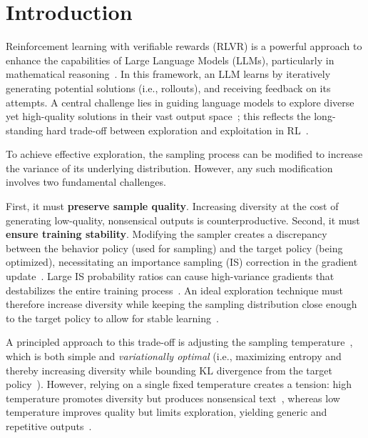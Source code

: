 \section{Introduction}
\label{sec:introduction}

Reinforcement learning with verifiable rewards (RLVR) is a powerful approach to enhance the capabilities of Large Language Models (LLMs), particularly in mathematical reasoning~\citep{openai2024learning, guo2025deepseek, team2025kimi, yang2025qwen3}. 
In this framework, an LLM learns by iteratively generating potential solutions (i.e., rollouts), and receiving feedback on its attempts. 
A central challenge lies in guiding language models to explore diverse yet high-quality solutions in their vast output space~\citep{cheng2025reasoning};
this reflects the long-standing hard trade-off between exploration and exploitation in RL~\citep{thrun1992efficient, sutton1998reinforcement}.

To achieve effective exploration, the sampling process can be modified to increase the variance of its underlying distribution.
However, any such modification involves two fundamental challenges.

First, it must \textbf{preserve sample quality}. Increasing diversity at the cost of generating low-quality, nonsensical outputs is counterproductive.
Second, it must \textbf{ensure training stability}.
Modifying the sampler creates a discrepancy between the behavior policy (used for sampling) and the target policy (being optimized), necessitating an importance sampling (IS) correction in the gradient update~\citep{degris2012off}.
Large IS probability ratios can cause high-variance gradients that destabilizes the entire training process~\citep{schulman2017proximal}.
An ideal exploration technique must therefore increase diversity while keeping the sampling distribution close enough to the target policy to allow for stable learning~\citep{haarnoja2018soft, ziegler2019fine}.

A principled approach to this trade-off is adjusting the sampling temperature~\citep{ACKLEY1985147, hou2025t1}, which is both simple and \emph{variationally optimal} (i.e., maximizing entropy and thereby increasing diversity while bounding KL divergence from the target policy~\citep{jaynes1957information}).
However, relying on a single fixed temperature creates a tension:
high temperature promotes diversity but produces nonsensical text~\citep{renze-2024-effect, wang2025beyond},
whereas low temperature improves quality but limits exploration, yielding generic and repetitive outputs~\citep{Holtzman2020The, guo2025deepseek}.

